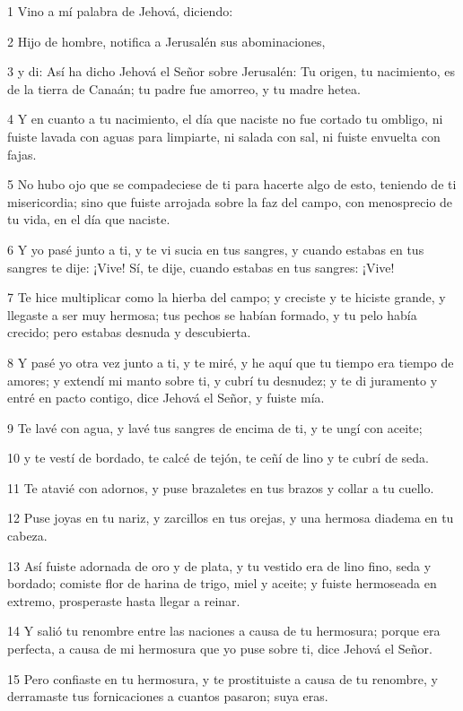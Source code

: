 \par 1 Vino a mí palabra de Jehová, diciendo:
\par 2 Hijo de hombre, notifica a Jerusalén sus abominaciones,
\par 3 y di: Así ha dicho Jehová el Señor sobre Jerusalén: Tu origen, tu nacimiento, es de la tierra de Canaán; tu padre fue amorreo, y tu madre hetea.
\par 4 Y en cuanto a tu nacimiento, el día que naciste no fue cortado tu ombligo, ni fuiste lavada con aguas para limpiarte, ni salada con sal, ni fuiste envuelta con fajas.
\par 5 No hubo ojo que se compadeciese de ti para hacerte algo de esto, teniendo de ti misericordia; sino que fuiste arrojada sobre la faz del campo, con menosprecio de tu vida, en el día que naciste.
\par 6 Y yo pasé junto a ti, y te vi sucia en tus sangres, y cuando estabas en tus sangres te dije: ¡Vive! Sí, te dije, cuando estabas en tus sangres: ¡Vive!
\par 7 Te hice multiplicar como la hierba del campo; y creciste y te hiciste grande, y llegaste a ser muy hermosa; tus pechos se habían formado, y tu pelo había crecido; pero estabas desnuda y descubierta.
\par 8 Y pasé yo otra vez junto a ti, y te miré, y he aquí que tu tiempo era tiempo de amores; y extendí mi manto sobre ti, y cubrí tu desnudez; y te di juramento y entré en pacto contigo, dice Jehová el Señor, y fuiste mía.
\par 9 Te lavé con agua, y lavé tus sangres de encima de ti, y te ungí con aceite;
\par 10 y te vestí de bordado, te calcé de tejón, te ceñí de lino y te cubrí de seda.
\par 11 Te atavié con adornos, y puse brazaletes en tus brazos y collar a tu cuello.
\par 12 Puse joyas en tu nariz, y zarcillos en tus orejas, y una hermosa diadema en tu cabeza.
\par 13 Así fuiste adornada de oro y de plata, y tu vestido era de lino fino, seda y bordado; comiste flor de harina de trigo, miel y aceite; y fuiste hermoseada en extremo, prosperaste hasta llegar a reinar.
\par 14 Y salió tu renombre entre las naciones a causa de tu hermosura; porque era perfecta, a causa de mi hermosura que yo puse sobre ti, dice Jehová el Señor.
\par 15 Pero confiaste en tu hermosura, y te prostituiste a causa de tu renombre, y derramaste tus fornicaciones a cuantos pasaron; suya eras.
